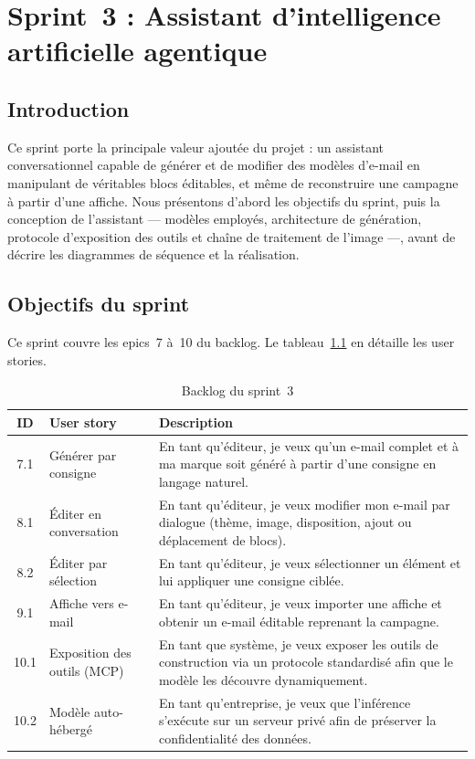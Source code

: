 \chapter{Sprint~3 : Assistant d'intelligence artificielle agentique}
\label{chap:sprint3}

\section*{Introduction}
Ce sprint porte la principale valeur ajoutée du projet : un assistant
conversationnel capable de générer et de modifier des modèles d'e-mail en
manipulant de véritables blocs éditables, et même de reconstruire une
campagne à partir d'une affiche. Nous présentons d'abord les objectifs du
sprint, puis la conception de l'assistant — modèles employés, architecture
de génération, protocole d'exposition des outils et chaîne de traitement de
l'image —, avant de décrire les diagrammes de séquence et la réalisation.

\section{Objectifs du sprint}
Ce sprint couvre les epics~7 à~10 du backlog. Le
tableau~\ref{tab:backlog-s3} en détaille les user stories.

\begin{table}[H]
\centering
\caption{Backlog du sprint~3}
\label{tab:backlog-s3}
\small
\begin{tabularx}{\linewidth}{clX}
\toprule
\textbf{ID} & \textbf{User story} & \textbf{Description} \\
\midrule
7.1 & Générer par consigne & En tant qu'éditeur, je veux qu'un e-mail complet et à ma marque soit généré à partir d'une consigne en langage naturel. \\
8.1 & Éditer en conversation & En tant qu'éditeur, je veux modifier mon e-mail par dialogue (thème, image, disposition, ajout ou déplacement de blocs). \\
8.2 & Éditer par sélection & En tant qu'éditeur, je veux sélectionner un élément et lui appliquer une consigne ciblée. \\
9.1 & Affiche vers e-mail & En tant qu'éditeur, je veux importer une affiche et obtenir un e-mail éditable reprenant la campagne. \\
10.1 & Exposition des outils (MCP) & En tant que système, je veux exposer les outils de construction via un protocole standardisé afin que le modèle les découvre dynamiquement. \\
10.2 & Modèle auto-hébergé & En tant qu'entreprise, je veux que l'inférence s'exécute sur un serveur privé afin de préserver la confidentialité des données. \\
\bottomrule
\end{tabularx}
\end{table}

